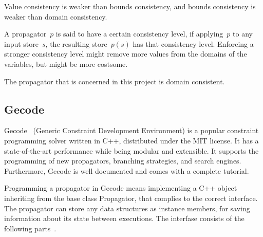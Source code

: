 \documentclass[a4paper,11pt]{article}
\numberwithin{equation}{section}
\begin{document}
Value consistency is weaker than bounds consistency, and bounds consistency
is weaker than domain consistency.

A propagator~$p$ is said to have a certain consistency level,
if applying~$p$ to any input store~$s$, the resulting store~$p(s)$
has that consistency level. Enforcing a stronger consistency level might 
remove more values from the domains of the variables, but might be
more costsome.

The propagator that is concerned in this project is domain consistent.

\subsection{Gecode}
\label{bg:gecode}
Gecode~\cite{Gecode} (Generic Constraint Development Environment)
is a popular constraint programming solver written in C++,
distributed under the MIT license.
It has a state-of-the-art performance while being modular and extensible.
It supports the programming of new propagators, branching strategies,
and search engines. Furthermore, Gecode is well documented and comes
with a complete tutorial.


Programming a propagator in Gecode means implementing a C++ object
inheriting from the base class Propagator,
that complies to the correct interface.
The propagator can store any data structures as instance members,
for saving information about its state between executions.
The interfase consists of 
the following parts~\cite{Gecode:MPG}.
\end{document}

